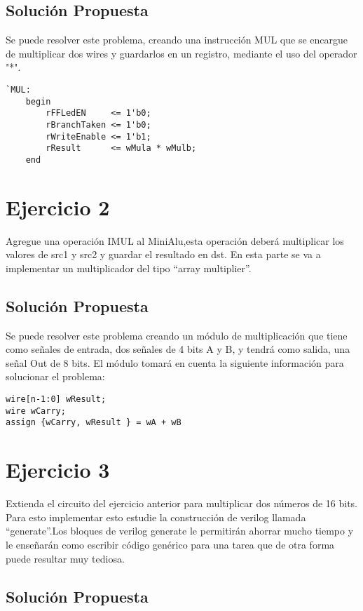 \documentclass[10pt]{article}
\begin{document}
\subsection*{Solución Propuesta}
Se puede resolver este problema, creando una instrucción MUL que se encargue de multiplicar dos wires y guardarlos en un registro, mediante
el uso del operador "*".

\begin{lstlisting}
`MUL:
	begin
		rFFLedEN     <= 1'b0;
		rBranchTaken <= 1'b0;
		rWriteEnable <= 1'b1;
		rResult      <= wMula * wMulb;
	end
\end{lstlisting}

\newpage
\section*{Ejercicio 2}
Agregue una operación IMUL al MiniAlu,esta operación deberá multiplicar los valores de
src1 y src2 y guardar el resultado en dst.
En esta parte se va a  implementar un multiplicador del tipo “array multiplier”.

\subsection*{Solución Propuesta}
Se puede resolver este problema creando un módulo de multiplicación que tiene como señales de entrada, dos señales de 4 bits A y B, y tendrá 
como salida, una señal Out de 8 bits.
El módulo tomará en cuenta la siguiente información para solucionar el problema:

\begin{lstlisting}
wire[n-1:0] wResult;
wire wCarry;     
assign {wCarry, wResult } = wA + wB
\end{lstlisting}

\newpage
\section*{Ejercicio 3}
Extienda el circuito del ejercicio anterior para multiplicar dos números de 16 bits. 
Para esto implementar esto estudie la construcción de verilog llamada “generate”.Los bloques de verilog generate le permitirán ahorrar mucho tiempo y le 
enseñarán como escribir código genérico para una tarea que de otra forma puede resultar muy tediosa.

\subsection*{Solución Propuesta}
\end{document}
